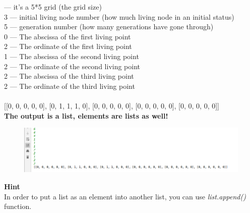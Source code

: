 \documentclass[]{article}
\begin{document}
  ---  it's a 5*5 grid (the grid size)\\
3  ---  initial living node number (how much living node in an initial status)\\
5  ---  generation number (how many generations have gone through)\\
0  ---  The abscissa of the first living point\\
2  ---  The ordinate of the first living point\\
1  ---  The abscissa of the second living point\\
2  ---  The ordinate of the second living point\\
2  ---  The abscissa of the third living point\\
2  ---  The ordinate of the third living point\\


\\

[[0, 0, 0, 0, 0], [0, 1, 1, 1, 0], [0, 0, 0, 0, 0], [0, 0, 0, 0, 0], [0, 0, 0, 0, 0]]\\

\noindent\textbf{The output is a list, elements are lists as well!}\\


\begin{figure}[H]
    \centering 
    \includegraphics[width=6.7in]{oc.png} 
    \label{fig:label1}
\end{figure}

\noindent\textbf{Hint}\\

In order to put a list as an element into another list, you can use \textit{list.append()} function.
\end{document}
